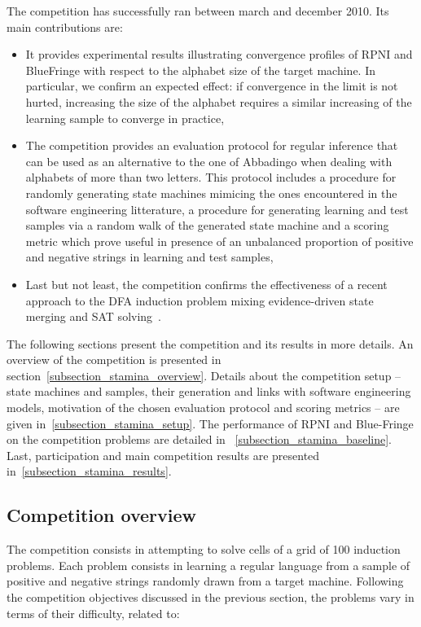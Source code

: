 The competition has successfully ran between march and december 2010. Its main contributions are:

\begin{itemize}
\item It provides experimental results illustrating convergence profiles of RPNI and BlueFringe with respect to the alphabet size of the target machine. In particular, we confirm an expected effect: if convergence in the limit is not hurted, increasing the size of the alphabet requires a similar increasing of the learning sample to converge in practice,
\item The competition provides an evaluation protocol for regular inference that can be used as an alternative to the one of Abbadingo when dealing with alphabets of more than two letters. This protocol includes a procedure for randomly generating state machines mimicing the ones encountered in the software engineering litterature, a procedure for generating learning and test samples via a random walk of the generated state machine and a scoring metric which prove useful in presence of an unbalanced proportion of positive and negative strings in learning and test samples,
\item Last but not least, the competition confirms the effectiveness of a recent approach to the DFA induction problem mixing evidence-driven state merging and SAT solving~\cite{Heule10}.
\end{itemize}

The following sections present the competition and its results in more details. An overview of the competition is presented in section~\ref{subsection_stamina_overview}. Details about the competition setup -- state machines and samples, their generation and links with software engineering models, motivation of the chosen evaluation protocol and scoring metrics -- are  given in~\ref{subsection_stamina_setup}. The performance of RPNI and Blue-Fringe on the competition problems are detailed in ~\ref{subsection_stamina_baseline}. Last, participation and main competition results are presented in~\ref{subsection_stamina_results}.

\subsection{Competition overview\label{subsection_stamina_overview}}

The competition consists in attempting to solve cells of a grid of 100 induction problems. Each problem consists in learning a regular language from a sample of positive and negative strings randomly drawn from a target machine. Following the competition objectives discussed in the previous section, the problems vary in terms of their difficulty, related to:

